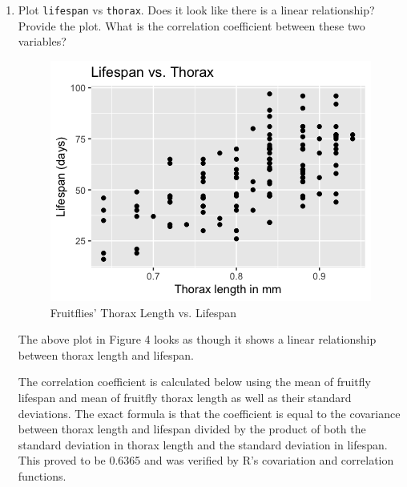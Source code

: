 \documentclass[12pt,letterpaper]{article}
\begin{document}
\begin{enumerate}
	\vspace{.5cm}

\newpage
	\item
	Plot \texttt{lifespan} vs \texttt{thorax}. Does it look like there is a linear relationship? Provide the plot. What is the correlation coefficient between these two variables?
	
	\vspace{.5cm}
		
	 	
	
	\begin{figure}[h!]
	\caption{\footnotesize{Fruitflies' Thorax Length vs. Lifespan}}
	\vspace{.5cm}
	\centering
	\label{fig:lifespanthorax}
	\includegraphics[width=1\textwidth]{./PS2_Graph_3.png}
	\end{figure}

	The above plot in Figure 4 looks as though it shows a linear relationship between thorax length and lifespan.

	\vspace{.5cm}
	
	The correlation coefficient is calculated below using the mean of fruitfly lifespan and mean of fruitfly thorax length as well as their standard deviations. The exact formula is that the coefficient is equal to the covariance between thorax length and lifespan divided by the product of both the standard deviation in thorax length and the standard deviation in lifespan. This proved to be 0.6365 and was verified by R's covariation and correlation functions.


\end{enumerate}
\end{document}
